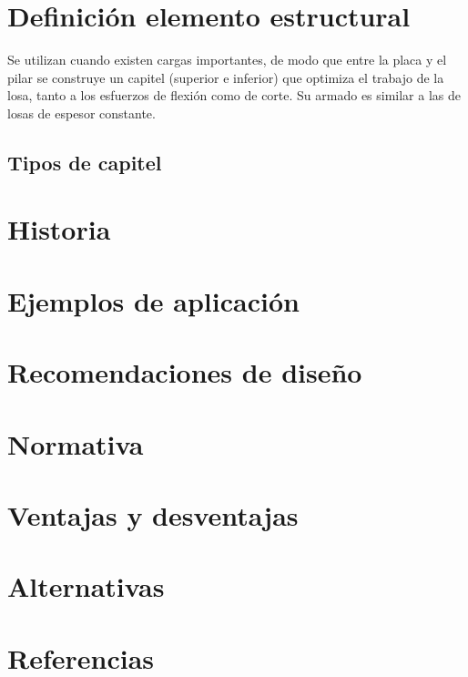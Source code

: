 \documentclass[letterpaper,11pt]{article} %
\begin{document}








\section{Definición elemento estructural}
    Se utilizan cuando existen cargas importantes, de modo que entre la placa y el pilar se construye un capitel (superior e inferior) que optimiza el trabajo de la losa, tanto a los esfuerzos de flexión como de corte. Su armado es similar a las de losas de espesor constante.
    \subsection{Tipos de capitel}
    
\section{Historia}

\section{Ejemplos de aplicación}

\section{Recomendaciones de diseño}

\section{Normativa}

\section{Ventajas y desventajas}

\section{Alternativas}

\section{Referencias}

\end{document}
